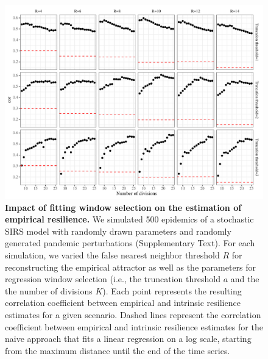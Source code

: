 \documentclass[12pt]{article}
\begin{document}
\begin{figure}[!th]
\includegraphics[width=\textwidth]{../figure_analysis_random/figure_analysis_random.pdf}
\caption{
\textbf{Impact of fitting window selection on the estimation of empirical resilience.}
We simulated 500 epidemics of a stochastic SIRS model with randomly drawn parameters and randomly generated pandemic perturbations (Supplementary Text).
For each simulation, we varied the false nearest neighbor threshold $R$ for reconstructing the empirical attractor as well as the parameters for regression window selection (i.e., the truncation threshold $a$ and the the number of divisions $K$).
Each point represents the resulting correlation coefficient between empirical and intrinsic resilience estimates for a given scenario.
Dashed lines represent the correlation coefficient between empirical and intrinsic resilience estimates for the naive approach that fits a linear regression on a log scale, starting from the maximum distance until the end of the time series.
}
\end{figure}

\pagebreak
\end{document}

